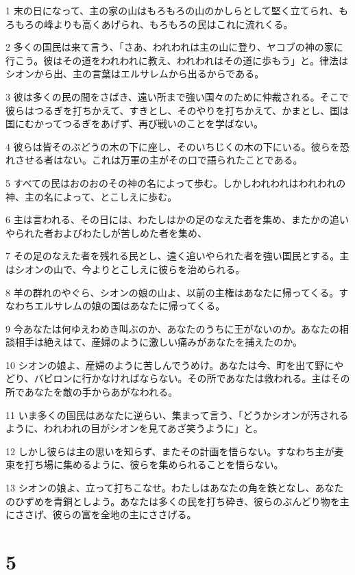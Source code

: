 \par 1 末の日になって、主の家の山はもろもろの山のかしらとして堅く立てられ、もろもろの峰よりも高くあげられ、もろもろの民はこれに流れくる。
\par 2 多くの国民は来て言う、「さあ、われわれは主の山に登り、ヤコブの神の家に行こう。彼はその道をわれわれに教え、われわれはその道に歩もう」と。律法はシオンから出、主の言葉はエルサレムから出るからである。
\par 3 彼は多くの民の間をさばき、遠い所まで強い国々のために仲裁される。そこで彼らはつるぎを打ちかえて、すきとし、そのやりを打ちかえて、かまとし、国は国にむかってつるぎをあげず、再び戦いのことを学ばない。
\par 4 彼らは皆そのぶどうの木の下に座し、そのいちじくの木の下にいる。彼らを恐れさせる者はない。これは万軍の主がその口で語られたことである。
\par 5 すべての民はおのおのその神の名によって歩む。しかしわれわれはわれわれの神、主の名によって、とこしえに歩む。
\par 6 主は言われる、その日には、わたしはかの足のなえた者を集め、またかの追いやられた者およびわたしが苦しめた者を集め、
\par 7 その足のなえた者を残れる民とし、遠く追いやられた者を強い国民とする。主はシオンの山で、今よりとこしえに彼らを治められる。
\par 8 羊の群れのやぐら、シオンの娘の山よ、以前の主権はあなたに帰ってくる。すなわちエルサレムの娘の国はあなたに帰ってくる。
\par 9 今あなたは何ゆえわめき叫ぶのか、あなたのうちに王がないのか。あなたの相談相手は絶えはて、産婦のように激しい痛みがあなたを捕えたのか。
\par 10 シオンの娘よ、産婦のように苦しんでうめけ。あなたは今、町を出て野にやどり、バビロンに行かなければならない。その所であなたは救われる。主はその所であなたを敵の手からあがなわれる。
\par 11 いま多くの国民はあなたに逆らい、集まって言う、「どうかシオンが汚されるように、われわれの目がシオンを見てあざ笑うように」と。
\par 12 しかし彼らは主の思いを知らず、またその計画を悟らない。すなわち主が麦束を打ち場に集めるように、彼らを集められることを悟らない。
\par 13 シオンの娘よ、立って打ちこなせ。わたしはあなたの角を鉄となし、あなたのひずめを青銅としよう。あなたは多くの民を打ち砕き、彼らのぶんどり物を主にささげ、彼らの富を全地の主にささげる。

\chapter{5}

